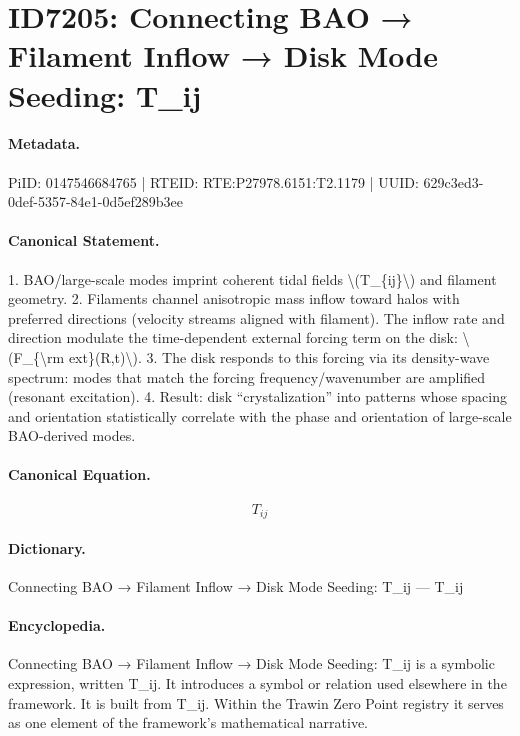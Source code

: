 \section*{ID7205: Connecting BAO → Filament Inflow → Disk Mode Seeding: T\_ij}
\paragraph{Metadata.}
PiID: 0147546684765 | RTEID: RTE:P27978.6151:T2.1179 | UUID: 629c3ed3-0def-5357-84e1-0d5ef289b3ee

\paragraph{Canonical Statement.}
1. BAO/large-scale modes imprint coherent tidal fields \textbackslash{}(T\_\{ij\}\textbackslash{}) and filament geometry. 2. Filaments channel anisotropic mass inflow toward halos with preferred directions (velocity streams aligned with filament). The inflow rate and direction modulate the time-dependent external forcing term on the disk: \textbackslash{}(F\_\{\textbackslash{}rm ext\}(R,t)\textbackslash{}). 3. The disk responds to this forcing via its density-wave spectrum: modes that match the forcing frequency/wavenumber are amplified (resonant excitation). 4. Result: disk “crystalization” into patterns whose spacing and orientation statistically correlate with the phase and orientation of large-scale BAO-derived modes.

\paragraph{Canonical Equation.}
\[
T_{ij}
\]

\paragraph{Dictionary.}
Connecting BAO → Filament Inflow → Disk Mode Seeding: T\_ij — T\_ij

\paragraph{Encyclopedia.}
Connecting BAO → Filament Inflow → Disk Mode Seeding: T\_ij is a symbolic expression, written T\_ij. It introduces a symbol or relation used elsewhere in the framework. It is built from T\_ij. Within the Trawin Zero Point registry it serves as one element of the framework's mathematical narrative.
